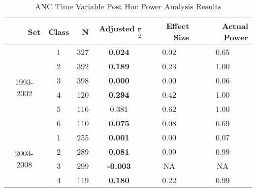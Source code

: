 \begin{table}[htbp]
  \centering
	  \caption{ANC Time Variable Post Hoc Power Analysis Results}
    \begin{tabular}{rrrrrr}
    \toprule
    Set   & Class & N     & Adjusted r$^2$ & Effect Size & Actual Power \\
    \midrule
    \multicolumn{1}{c}{\multirow{6}[1]{*}{\begin{sideways}1993-2002\end{sideways}}} & \multicolumn{1}{c}{1} & \multicolumn{1}{c}{327} & \multicolumn{1}{c}{\textbf{0.024 }} & \multicolumn{1}{c}{0.02 } & \multicolumn{1}{c}{0.65 } \\
    \multicolumn{1}{c}{} & \multicolumn{1}{c}{2} & \multicolumn{1}{c}{392} & \multicolumn{1}{c}{\textbf{0.189 }} & \multicolumn{1}{c}{0.23 } & \multicolumn{1}{c}{1.00 } \\
    \multicolumn{1}{c}{} & \multicolumn{1}{c}{3} & \multicolumn{1}{c}{398} & \multicolumn{1}{c}{\textbf{0.000 }} & \multicolumn{1}{c}{0.00 } & \multicolumn{1}{c}{0.06 } \\
    \multicolumn{1}{c}{} & \multicolumn{1}{c}{4} & \multicolumn{1}{c}{120} & \multicolumn{1}{c}{\textbf{0.294 }} & \multicolumn{1}{c}{0.42 } & \multicolumn{1}{c}{1.00 } \\
    \multicolumn{1}{c}{} & \multicolumn{1}{c}{5} & \multicolumn{1}{c}{116} & \multicolumn{1}{c}{0.381 } & \multicolumn{1}{c}{0.62 } & \multicolumn{1}{c}{1.00 } \\
    \multicolumn{1}{c}{} & \multicolumn{1}{c}{6} & \multicolumn{1}{c}{110} & \multicolumn{1}{c}{\textbf{0.075 }} & \multicolumn{1}{c}{0.08 } & \multicolumn{1}{c}{0.69 } \\\midrule
    \multicolumn{1}{c}{\multirow{6}[2]{*}{\begin{sideways}2003-2008\end{sideways}}} & \multicolumn{1}{c}{1} & \multicolumn{1}{c}{255} & \multicolumn{1}{c}{\textbf{0.001 }} & \multicolumn{1}{c}{0.00 } & \multicolumn{1}{c}{0.07 } \\
    \multicolumn{1}{c}{} & \multicolumn{1}{c}{2} & \multicolumn{1}{c}{289} & \multicolumn{1}{c}{\textbf{0.081 }} & \multicolumn{1}{c}{0.09 } & \multicolumn{1}{c}{0.99 } \\
    \multicolumn{1}{c}{} & \multicolumn{1}{c}{3} & \multicolumn{1}{c}{299} & \multicolumn{1}{c}{\textbf{-0.003 }} & \multicolumn{1}{c}{NA} & \multicolumn{1}{c}{NA} \\
    \multicolumn{1}{c}{} & \multicolumn{1}{c}{4} & \multicolumn{1}{c}{119} & \multicolumn{1}{c}{\textbf{0.180 }} & \multicolumn{1}{c}{0.22 } & \multicolumn{1}{c}{0.99 } \\

\end{tabular}
\end{table}
